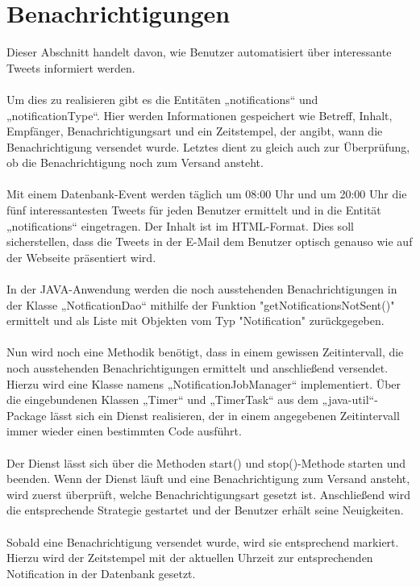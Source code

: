 \section{Benachrichtigungen}

Dieser Abschnitt handelt davon, wie Benutzer automatisiert über interessante Tweets informiert werden.
\\\\
Um dies zu realisieren gibt es die Entitäten „notifications“ und „notificationType“. Hier werden Informationen gespeichert wie Betreff, Inhalt, Empfänger, Benachrichtigungsart und ein Zeitstempel, der angibt, wann die Benachrichtigung versendet wurde. Letztes dient zu gleich auch zur Überprüfung, ob die Benachrichtigung noch zum Versand ansteht.
\\\\
Mit einem Datenbank-Event werden täglich um 08:00 Uhr und um 20:00 Uhr die fünf interessantesten Tweets für jeden Benutzer ermittelt und in die Entität „notifications“ eingetragen. Der Inhalt ist im HTML-Format. Dies soll sicherstellen, dass die Tweets in der E-Mail dem Benutzer optisch genauso wie auf der Webseite präsentiert wird.
\\\\
In der JAVA-Anwendung werden die noch ausstehenden Benachrichtigungen in der Klasse „NotficationDao“ mithilfe der Funktion "getNotificationsNotSent()" ermittelt und als Liste mit Objekten vom Typ "Notification" zurückgegeben.
\\\\
Nun wird noch eine Methodik benötigt, dass in einem gewissen Zeitintervall, die noch ausstehenden Benachrichtigungen ermittelt und anschließend versendet. Hierzu wird eine Klasse namens „NotificationJobManager“ implementiert. Über die eingebundenen Klassen „Timer“ und „TimerTask“ aus dem „java-util“-Package lässt sich ein Dienst realisieren, der in einem angegebenen Zeitintervall immer wieder einen bestimmten Code ausführt.
\\\\
Der Dienst lässt sich über die Methoden start() und stop()-Methode starten und beenden. Wenn der Dienst läuft und eine Benachrichtigung zum Versand ansteht, wird zuerst überprüft, welche Benachrichtigungsart gesetzt ist. Anschließend wird die entsprechende Strategie gestartet und der Benutzer erhält seine Neuigkeiten.
\\\\
Sobald eine Benachrichtigung versendet wurde, wird sie entsprechend markiert. Hierzu wird der Zeitstempel mit der aktuellen Uhrzeit zur entsprechenden Notification in der Datenbank gesetzt.


